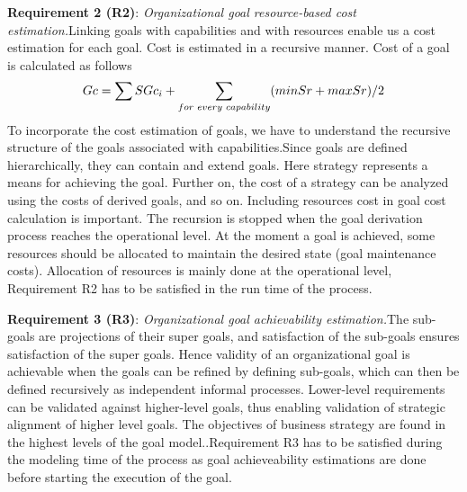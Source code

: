 \hspace{4ex} \textbf{Requirement 2 (R2)}: \textit{Organizational goal resource-based cost estimation.}Linking goals with capabilities and with resources enable us a cost estimation for each goal. Cost is estimated in a recursive manner. Cost of a goal is calculated as follows  
\begin{equation}
	Gc = \sum SGc_i + \sum_{for\hspace{0.1cm}every\hspace{0.1cm}capability} (min Sr + max Sr)/2
\end{equation}
To incorporate the cost estimation of goals, we have to understand the recursive structure of the goals associated with capabilities.Since goals are defined hierarchically, they can contain and extend goals. Here strategy represents a means for achieving the goal. Further on, the cost of a strategy can be analyzed using the costs of derived  goals, and so on. Including resources cost in goal cost calculation is important. The recursion is stopped when the goal derivation process reaches the operational
level. At the moment a  goal is achieved, some resources should be allocated to maintain the desired state (goal maintenance costs)\cite{Mandic2010}. Allocation of resources is mainly done at the operational level, Requirement R2 has to be satisfied in the run time of the process.

\hspace{4ex} \textbf{Requirement 3 (R3)}: \textit{Organizational goal achievability estimation.}The sub-goals are projections of their super goals, and satisfaction of the sub-goals ensures satisfaction of the super goals. Hence validity of an organizational goal is achievable when the goals can be refined by defining sub-goals, which can then be defined recursively as independent informal processes. Lower-level requirements can be validated against higher-level goals, thus enabling validation of strategic alignment of  higher level goals. The objectives of business strategy are found in the highest levels of the goal model.\cite{Bleistein2006}.Requirement R3 has to be satisfied during the modeling time of the process as goal achieveability estimations are done before starting the execution of the goal.

